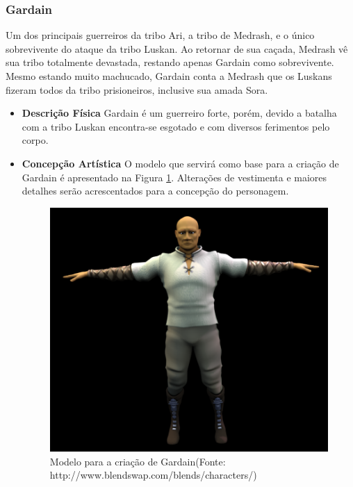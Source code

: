 \subsubsection{Gardain}
Um dos principais guerreiros da tribo Ari, a tribo de Medrash, e o único
 sobrevivente do ataque da tribo Luskan. Ao retornar de sua caçada, Medrash
 vê sua tribo totalmente devastada, restando apenas Gardain como
 sobrevivente. Mesmo estando muito machucado, Gardain conta a Medrash que
 os Luskans fizeram todos da tribo prisioneiros, inclusive sua amada Sora. 
\begin{itemize}
\item {\bf Descrição Física}
Gardain é um guerreiro forte, porém, devido a batalha com a tribo Luskan
 encontra-se esgotado e com diversos ferimentos pelo corpo.
\item {\bf Concepção Artística}
O modelo que servirá como base para a criação de Gardain é apresentado na
 Figura \ref{img:gardain}. Alterações de vestimenta e maiores detalhes
 serão acrescentados para a concepção do personagem.

\begin{figure}[!ht]
 \centering
 \includegraphics[scale=1]{Imagens/gardain01.png}
 \caption{Modelo para a criação de Gardain(Fonte: http://www.blendswap.com/blends/characters/)}
\label{img:gardain}
\end{figure}


\end{itemize}
